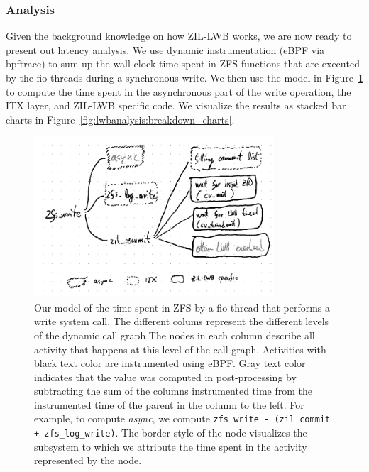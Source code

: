 \documentclass[12pt,a4paper,twoside]{book}
\begin{document}
\subsubsection{Analysis}

Given the background knowledge on how ZIL-LWB works, we are now ready to present out latency analysis.
We use dynamic instrumentation (eBPF via bpftrace) to sum up the wall clock time spent in ZFS functions that are executed by the fio threads during a synchronous write.
We then use the model in Figure~\ref{fig:lwbanalysis:breakdown_model} to compute the time spent in the asynchronous part of the write operation, the ITX layer, and ZIL-LWB specific code.
We visualize the results as stacked bar charts in Figure~\ref{fig:lwbanalysis:breakdown_charts}.

\begin{figure}[H]
    \centering
    \includegraphics[height=6cm]{fig/zil_lwb_latency_analysis__breakdown}
    \caption{Our model of the time spent in ZFS by a fio thread that performs a write system call.
    The different colums represent the different levels of the dynamic call graph
    The nodes in each column describe all activity that happens at this level of the call graph.
    Activities with black text color are instrumented using eBPF.
    Gray text color indicates that the value was computed in post-processing by subtracting the sum of the columns instrumented time from the instrumented time of the parent in the column to the left.
    For example, to compute \textit{async}, we compute \lstinline{zfs_write - (zil_commit + zfs_log_write)}.
    The border style of the node visualizes the subsystem to which we attribute the time spent in the activity represented by the node.
    }
    \label{fig:lwbanalysis:breakdown_model}
\end{figure}
\end{document}
